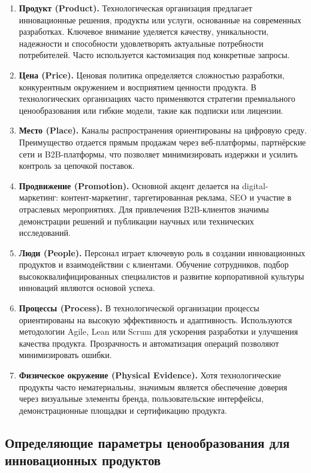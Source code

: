 \begin{enumerate}
    \item \textbf{Продукт (Product).} Технологическая организация предлагает инновационные решения, продукты или услуги, основанные на современных разработках. Ключевое внимание уделяется качеству, уникальности, надежности и способности удовлетворять актуальные потребности потребителей. Часто используется кастомизация под конкретные запросы.
    \item \textbf{Цена (Price).} Ценовая политика определяется сложностью разработки, конкурентным окружением и восприятием ценности продукта. В технологических организациях часто применяются стратегии премиального ценообразования или гибкие модели, такие как подписки или лицензии.
    \item \textbf{Место (Place).} Каналы распространения ориентированы на цифровую среду. Преимущество отдается прямым продажам через веб-платформы, партнёрские сети и B2B-платформы, что позволяет минимизировать издержки и усилить контроль за цепочкой поставок.
    \item \textbf{Продвижение (Promotion).} Основной акцент делается на digital-маркетинг: контент-маркетинг, таргетированная реклама, SEO и участие в отраслевых мероприятиях. Для привлечения B2B-клиентов значимы демонстрации решений и публикации научных или технических исследований.
    \item \textbf{Люди (People).} Персонал играет ключевую роль в создании инновационных продуктов и взаимодействии с клиентами. Обучение сотрудников, подбор высококвалифицированных специалистов и развитие корпоративной культуры инноваций являются основой успеха.
    \item \textbf{Процессы (Process).} В технологической организации процессы ориентированы на высокую эффективность и адаптивность. Используются методологии Agile, Lean или Scrum для ускорения разработки и улучшения качества продукта. Прозрачность и автоматизация операций позволяют минимизировать ошибки.
    \item \textbf{Физическое окружение (Physical Evidence).} Хотя технологические продукты часто нематериальны, значимым является обеспечение доверия через визуальные элементы бренда, пользовательские интерфейсы, демонстрационные площадки и сертификацию продукта.
\end{enumerate}

\pagebreak

\subsection{Определяющие параметры ценообразования для инновационных продуктов}

